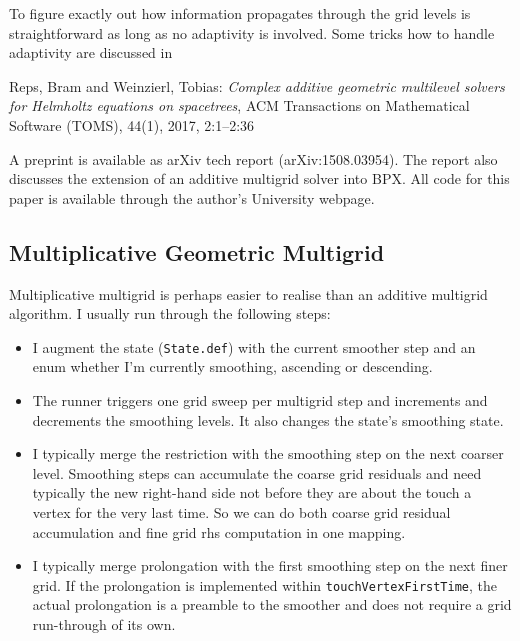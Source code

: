 To figure exactly out how information propagates through the grid levels is
straightforward as long as no adaptivity is involved.
Some tricks how to handle adaptivity are discussed in 

 \begin{framed} 
 \noindent
Reps, Bram and Weinzierl, Tobias: {\em Complex additive geometric
  multilevel solvers for Helmholtz equations on spacetrees}, ACM Transactions on
  Mathematical Software (TOMS), 44(1), 2017, 2:1--2:36
 \end{framed}
  
\noindent
A preprint is available as arXiv tech report (arXiv:1508.03954).
The report also discusses the extension of an additive multigrid solver into 
BPX.
All code for this paper is available through the author's University webpage.


\subsection{Multiplicative Geometric Multigrid}

Multiplicative multigrid is perhaps easier to realise than an additive multigrid
algorithm. I usually run through the following steps:

\begin{itemize}
  \item I augment the state (\texttt{State.def}) with the current smoother step
  and an enum whether I'm currently smoothing, ascending or descending.
  \item The runner triggers one grid sweep per multigrid step and increments and
  decrements the smoothing levels. It also changes the state's smoothing state.
  \item I typically merge the restriction with the smoothing step on the next
  coarser level. Smoothing steps can accumulate the coarse grid residuals and
  need typically the new right-hand side not before they are about the touch a
  vertex for the very last time. So we can do both coarse grid residual
  accumulation and fine grid rhs computation in one mapping.
  \item I typically merge prolongation with the first smoothing step on the next
  finer grid. If the prolongation is implemented within
  \texttt{touchVertexFirstTime}, the actual prolongation is a preamble to the
  smoother and does not require a grid run-through of its own.
\end{itemize}


